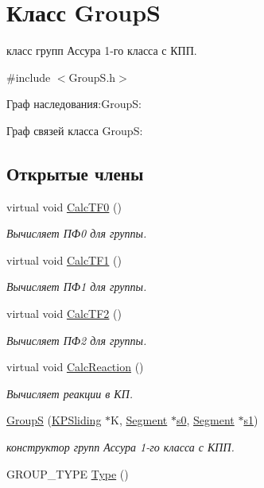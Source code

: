 \hypertarget{class_group_s}{
\section{Класс GroupS}
\label{class_group_s}
}


класс групп Ассура 1-\/го класса с КПП.  




{\ttfamily \#include $<$GroupS.h$>$}



Граф наследования:GroupS:


Граф связей класса GroupS:
\subsection*{Открытые члены}
\begin{DoxyCompactItemize}
\item 
virtual void \hyperlink{class_group_s_a39db4d1d5e53abfca35eaeadec340d3e}{CalcTF0} ()
\begin{DoxyCompactList}\small\item\em Вычисляет ПФ0 для группы. \item\end{DoxyCompactList}\item 
virtual void \hyperlink{class_group_s_a65ff8b610b22fffe4615291d63089f4e}{CalcTF1} ()
\begin{DoxyCompactList}\small\item\em Вычисляет ПФ1 для группы. \item\end{DoxyCompactList}\item 
virtual void \hyperlink{class_group_s_a810b920a934867e4fb582acceb30717b}{CalcTF2} ()
\begin{DoxyCompactList}\small\item\em Вычисляет ПФ2 для группы. \item\end{DoxyCompactList}\item 
virtual void \hyperlink{class_group_s_af7a2b0c0adaee3111d15e5c9aa8ef091}{CalcReaction} ()
\begin{DoxyCompactList}\small\item\em Вычисляет реакции в КП. \item\end{DoxyCompactList}\item 
\hyperlink{class_group_s_a3ae209d48ad8bfaab6db298f73bf0fd7}{GroupS} (\hyperlink{class_k_p_sliding}{KPSliding} $\ast$K, \hyperlink{class_segment}{Segment} $\ast$\hyperlink{class_group1_a769c658c59d6045b6af2a6ba1d920660}{s0}, \hyperlink{class_segment}{Segment} $\ast$\hyperlink{class_group1_acf0f92405ee52288a65b0ec48d523c74}{s1})
\begin{DoxyCompactList}\small\item\em конструктор групп Ассура 1-\/го класса с КПП. \item\end{DoxyCompactList}\item 
GROUP\_\-TYPE \hyperlink{class_group_s_a66a268eb9c834ab0ebdf51fc43a82642}{Type} ()
\end{DoxyCompactItemize}
